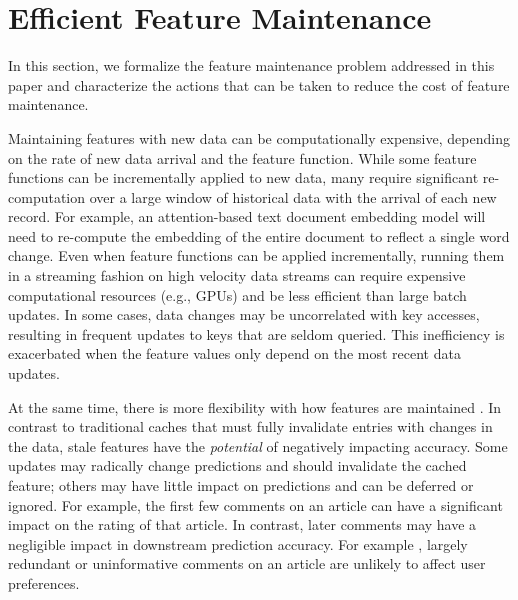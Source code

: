 \section{Efficient Feature Maintenance}

In this section, we formalize the feature maintenance problem addressed in this paper and characterize the actions that can be taken to reduce the cost of feature maintenance.

Maintaining features with new data can be computationally expensive, depending on the rate of new data arrival and the feature function. While some feature functions can be incrementally applied to new data, many require significant re-computation over a large window of historical data with the arrival of each new record.   
For example, an attention-based text document embedding model will need to re-compute the embedding of the entire document to reflect a single word change. 
Even when feature functions can be applied incrementally, running them in a streaming fashion on high velocity data streams can require expensive computational resources (e.g., GPUs) and be less efficient than large batch updates. 
In some cases,  data changes may be uncorrelated with  key accesses, resulting in frequent updates to keys that are seldom queried.
This inefficiency  is exacerbated when the feature values only depend on the most recent data updates.


At the same time, there is more flexibility  with how features are maintained . In contrast to traditional caches that must fully invalidate entries with changes in the data, stale features have the \emph{potential} of negatively impacting accuracy.  
Some updates may radically change predictions and should invalidate the cached feature; others may have little impact on predictions and can be deferred or ignored. 
For example, the first few comments on an article can have a significant impact on the rating of that article.
In contrast, later comments may have a negligible impact in downstream prediction accuracy. 
For example , largely redundant or uninformative comments on an article are unlikely to affect user preferences.



